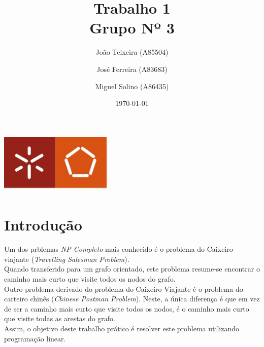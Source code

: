 \documentclass[a4paper]{report}
\begin{document}
\title{Trabalho 1\\ 
\large Grupo Nº 3}
\author{João Teixeira (A85504) \and José Ferreira (A83683) \and Miguel Solino (A86435)}
\date{\today}

\begin{center}
    \begin{minipage}{0.75\linewidth}
        \centering
        \includegraphics[width=0.4\textwidth]{images/eng.jpeg}\par\vspace{1cm}
        \vspace{1.5cm}
        \href{https://www.uminho.pt/PT}
        {\color{black}{\scshape\LARGE Universidade do Minho}} \par
        \vspace{1cm}
        \href{https://www.di.uminho.pt/}
        {\color{black}{\scshape\Large Departamento de Informática}} \par
        \vspace{1.5cm}
        \maketitle
    \end{minipage}
\end{center}

\tableofcontents

\pagebreak

\chapter{Introdução}
Um dos prblemas \textit{NP-Completo} mais conhecido é o problema do
Caixeiro viajante (\textit{Travelling Salesman Problem}). \\
Quando transferido para um grafo orientado, este problema resume-se
encontrar o caminho mais curto que visite todos os nodos do grafo.\\
Outro problema derivado do problema do Caixeiro Viajante é o problema
do carteiro chinês (\textit{Chinese Postman Problem}). Neste, a única
diferença é que em vez de ser a caminho mais curto que visite todos
os nodos, é o caminho mais curto que visite todas as arestas do grafo. \\
Assim, o objetivo deste trabalho prático é resolver este problema
utilizando programação linear.
\end{document}
